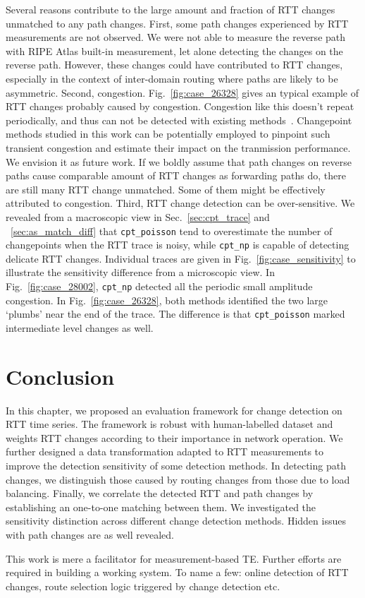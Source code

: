 Several reasons contribute to the large amount and fraction of RTT changes unmatched to any path changes.
First, some path changes experienced by RTT measurements are not observed. We were not able to measure the reverse path with RIPE Atlas built-in measurement, let alone detecting the changes on the reverse path. However, these changes could have contributed to RTT changes, especially in the context of inter-domain routing where paths are likely to be asymmetric.
Second, congestion. Fig.~\ref{fig:case_26328} gives an typical example of RTT changes probably caused by congestion.
Congestion like this doesn't repeat periodically, and thus can not be detected with existing methods~\cite{Luckie2014}.
Changepoint methods studied in this work can be potentially employed to pinpoint such transient congestion and estimate their
impact on the tranmission performance. We envision it as future work.
If we boldly assume that path changes on reverse paths cause comparable amount of RTT changes as forwarding paths do, there are still many RTT change unmatched. Some of them might be effectively attributed to congestion.
Third, RTT change detection can be over-sensitive. We revealed from a macroscopic view in Sec.~\ref{sec:cpt_trace} and ~\ref{sec:as_match_diff} that \texttt{cpt\_poisson} tend to overestimate the number of changepoints when the RTT trace is noisy, while \texttt{cpt\_np} is capable of detecting delicate RTT changes. Individual traces are given in Fig.~\ref{fig:case_sensitivity} to illustrate the sensitivity difference from a microscopic view. In Fig.~\ref{fig:case_28002}, \texttt{cpt\_np} detected all the periodic small amplitude congestion. In Fig.~\ref{fig:case_26328}, both methods identified the two large `plumbs' near the end of the trace. The difference is that \texttt{cpt\_poisson} marked intermediate level changes as well.

\section*{Conclusion}
In this chapter, we proposed an evaluation framework for change detection on RTT time series.
The framework is robust with human-labelled dataset and weights RTT changes according to their importance in network operation. We further designed a data transformation adapted to RTT measurements to improve the detection sensitivity of some detection methods.
In detecting path changes, we distinguish those caused by routing changes from those due to load balancing.
Finally, we correlate the detected RTT and path changes by establishing an one-to-one matching between them. 
We investigated the sensitivity distinction across different change detection methods. 
Hidden issues with path changes are as well revealed.

This work is mere a facilitator for measurement-based TE. Further efforts are required in building a working system. To name a few: online detection of RTT changes, route selection logic triggered by change detection  etc.
